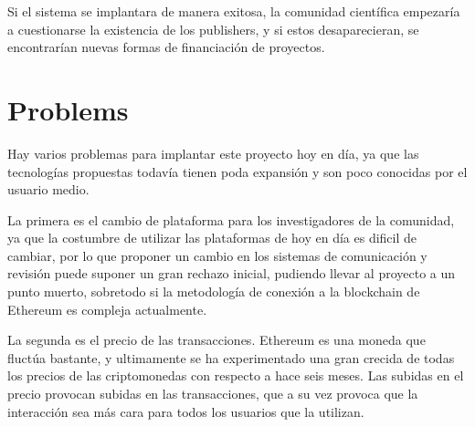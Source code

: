 Si el sistema se implantara de manera exitosa, la comunidad científica empezaría
a cuestionarse la existencia de los publishers, y si estos desaparecieran, se
encontrarían nuevas formas de financiación de proyectos.

\section{Problems}


Hay varios problemas para implantar este proyecto hoy en día, ya que las
tecnologías propuestas todavía tienen poda expansión y son poco conocidas por el
usuario medio.

La primera es el cambio de plataforma para los investigadores de la comunidad,
ya que la costumbre de utilizar las plataformas de hoy en día es dificil de
cambiar, por lo que proponer un cambio en los sistemas de comunicación y
revisión puede suponer un gran rechazo inicial, pudiendo llevar al proyecto a un
punto muerto, sobretodo si la metodología de conexión a la blockchain de
Ethereum es compleja actualmente.

La segunda es el precio de las transacciones. Ethereum es una moneda que fluctúa
bastante, y ultimamente se ha experimentado una gran crecida de todas los
precios de las criptomonedas con respecto a hace seis meses. Las subidas en el
precio provocan subidas en las transacciones, que a su vez provoca que la
interacción sea más cara para todos los usuarios que la utilizan.




